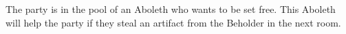 The party is in the pool of an Aboleth who wants to be set free.
This Aboleth will help the party if they steal an artifact from the Beholder in the next room.